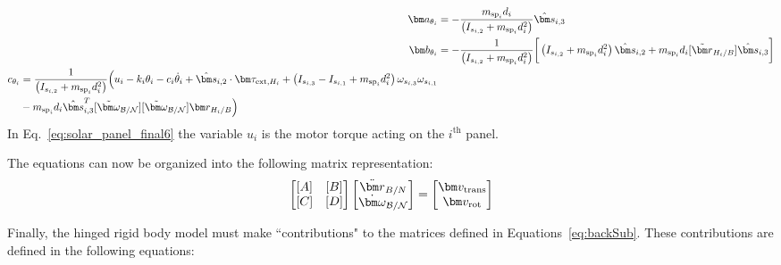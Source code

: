 \begin{subequations}
	\begin{align}
	\bm a_{\theta_i} &= - \frac{m_{\text{sp}_i} d_i}{\left( I_{s_{i,2}} + m_{\text{sp}_i} d_i^{2} \right)} \hat{\bm s}_{i,3}
	\label{eq:solar_panel_final11}
	\\
	\bm b_{\theta_i} &= -\frac{1}{\left( I_{s_{i,2}} + m_{\text{sp}_i} d_i^{2} \right)} \bigg[\left(I_{s_{i,2}} + m_{\text{sp}_i}d_i^{2}\right) \hat{\bm s}_{i,2}+m_{\text{sp}_i} d_i [\tilde{\bm r}_{H_i/B}] \hat{\bm s}_{i,3}\bigg]
	\\
	\begin{split}
	c_{\theta_i} &= \frac{1}{\left( I_{s_{i,2}} + m_{\text{sp}_i} d_i^{2} \right)} \Big(u_i - k_i \theta_i - c_i \dot\theta_i + \hat{\bm s}_{i,2} \cdot \bm \tau_{\text{ext},H_i} + \left( I_{s_{i,3}} - I_{s_{i,1}} + m_{\text{sp}_i}d_i^{2}\right) \omega_{s_{i,3}} \omega_{s_{i,1}} \\
	&- m_{\text{sp}_i} d_i \hat{\bm s}_{i,3}^{T} [\tilde{\bm\omega}_{\cal B/N}][\tilde{\bm\omega}_{\cal B/N}] \bm r_{H_i/B}\Big)
	\label{eq:solar_panel_final6}
	\end{split}
	\end{align}
\end{subequations}
In Eq.~\eqref{eq:solar_panel_final6} the variable $u_i$ is the motor torque acting on the $i^{\text{th}}$ panel.

The equations can now be organized into the following matrix representation:
\begin{equation}
\begin{bmatrix}
[A] & [B]\\
[C] & [D]
\end{bmatrix} \begin{bmatrix}
\ddot{\bm r}_{B/N}\\
\dot{\bm\omega}_{\cal B/N}
\end{bmatrix} = \begin{bmatrix}
\bm v_{\text{trans}}\\
\bm v_{\text{rot}}
\end{bmatrix}
\label{eq:backSub}
\end{equation}

Finally, the hinged rigid body model must make ``contributions" to the matrices defined in Equations~\eqref{eq:backSub}. These contributions are defined in the following equations:

